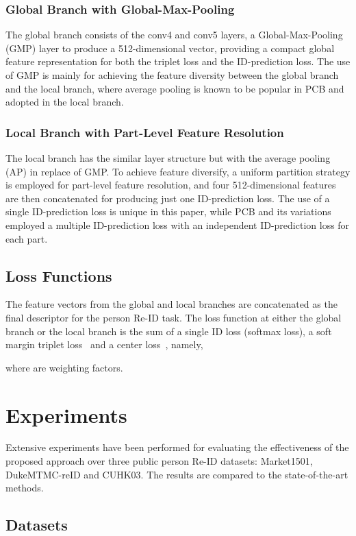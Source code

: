 \documentclass[journal]{IEEEtran}
\begin{document}
\subsubsection{Global Branch with Global-Max-Pooling}
The global branch consists of  the conv4 and conv5 layers, a Global-Max-Pooling (GMP) layer to produce a 512-dimensional vector, providing a compact global feature representation for both the triplet loss and the ID-prediction loss. The use of GMP is mainly for achieving the feature diversity between the global branch and the local branch, where average pooling is known to be popular in PCB \cite{sun2018beyond} and adopted in the local branch.

\subsubsection{Local Branch with Part-Level Feature Resolution}
The local branch has the similar layer structure but with the average pooling (AP) in replace of GMP. To achieve feature diversify, a uniform partition strategy is employed for part-level feature resolution, and four 512-dimensional features are then concatenated for producing just one ID-prediction loss. The use of a single ID-prediction loss is unique in this paper, while PCB and its variations employed a multiple ID-prediction loss with an independent ID-prediction loss for each part.

\subsection{Loss Functions}
The feature vectors from the global and local branches are concatenated as the final descriptor for the person
Re-ID task.  The loss function at either the global branch or the local branch is the sum of a single ID loss (softmax loss), a soft margin  triplet loss~\cite{hermans2017defense} and a center loss~\cite{wen2016discriminative}, namely,

where  are weighting factors.

\section{Experiments}
Extensive experiments have been performed for evaluating the effectiveness of the proposed approach over three public person Re-ID datasets: Market1501, DukeMTMC-reID and CUHK03. The results are compared to the state-of-the-art methods.

\subsection{Datasets}
\end{document}

